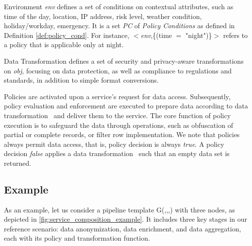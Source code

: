 \begin{definition}[Policy]
\begin{description}
    \item Environment \textit{env} defines a set of conditions on contextual attributes, such as time of the day, location, IP address, risk level, weather condition, holiday/workday, emergency. It is a set \emph{PC} of
          \emph{Policy Conditions} as defined in Definition \ref{def:policy_cond}.
          For instance, $<$\emph{env},\{(time $=$ "night")\}$>$ refers to a policy that is applicable only at night.

    \item Data Transformation \textit{\TF} defines a set of security and privacy-aware transformations on \textit{obj}, focusing on data protection, as well as compliance to regulations and standards, in addition to simple format conversions.
  \end{description}
\end{definition}

Policies are activated upon a service's request for data access. Subsequently, policy evaluation and enforcement are executed to prepare data according to data transformation \TF\ and deliver them to the service. The core function of policy execution is to safeguard the data through operations, such as obfuscation of partial or complete records, or filter row implementation. We note that policies always permit data access, that is, policy decision is always \emph{true}. A policy decision \emph{false} applies a data transformation \TF\ such that an empty data set is returned.

\subsection{Example}\label{sec:example}
  As an example, let us consider a pipeline template G(\V,\E,\myLambda,\myGamma) with three nodes, as depicted in \cref{fig:service_composition_example}.
  It includes three key stages in our reference scenario: data anonymization, data enrichment, and data aggregation, each with its policy and transformation function.

